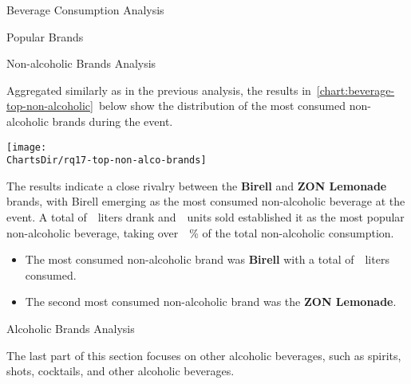 \begin{section}{Beverage Consumption Analysis}
\begin{subsection}{Popular Brands}
		\vspace*{\fill}\pagebreak[4] %

		\begin{subsubsection}{Non-alcoholic Brands Analysis}
			\label{subsubsec:analysis-beverage-popular-non-alcoholic}


			Aggregated similarly as in the previous analysis, the results in~\autoref{chart:beverage-top-non-alcoholic}~below show the distribution of the most consumed non-alcoholic brands during the event.

			\begin{chart}[H]
				\centering
				\texttt{[image: \\ChartsDir/rq17-top-non-alco-brands]}
				\caption{ Most Consumed Non-Alcoholic Brands}
				\label{chart:beverage-top-non-alcoholic}
				\source
			\end{chart}

			The results indicate a close rivalry between the \textbf{Birell} and \textbf{ZON Lemonade} brands, with Birell emerging as the most consumed non-alcoholic beverage at the event.
			A total of~~liters drank and~~units sold established it as the most popular non-alcoholic beverage, taking over~~\% of the total non-alcoholic consumption.

			\begin{keytakeaways}
				\begin{itemize}
					\item The most consumed non-alcoholic brand was \textbf{Birell} with a total of~~liters consumed.
					\item The second most consumed non-alcoholic brand was the \textbf{ZON Lemonade}.
				\end{itemize}
			\end{keytakeaways}
		\end{subsubsection}

		\begin{subsubsection}{Alcoholic Brands Analysis}
			\label{subsubsec:analysis-beverage-popular-alcoholic}

			The last part of this section focuses on other alcoholic beverages, such as spirits, shots, cocktails, and other alcoholic beverages.


\end{subsubsection}
\end{subsection}
\end{section}
